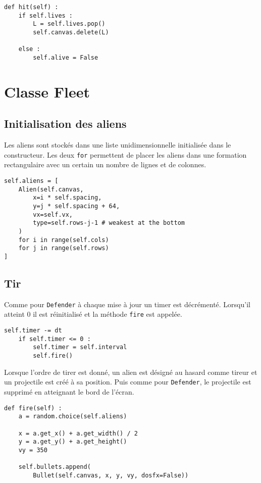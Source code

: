 \documentclass[12pt]{article}
\begin{document}
\begin{verbatim}
def hit(self) :
	if self.lives :
		L = self.lives.pop()
		self.canvas.delete(L)

	else :
		self.alive = False
\end{verbatim}
		





\vfill


\section{Classe Fleet}

	\subsection{Initialisation des aliens}

	Les aliens sont stockés dans une liste unidimensionnelle initialisée dans le constructeur. Les deux \texttt{for} permettent de placer les aliens dans une formation rectangulaire avec un certain un nombre de lignes et de colonnes.

\begin{verbatim}
self.aliens = [
	Alien(self.canvas, 
		x=i * self.spacing, 
		y=j * self.spacing + 64, 
		vx=self.vx, 
		type=self.rows-j-1 # weakest at the bottom
	)
	for i in range(self.cols)
	for j in range(self.rows)
]
\end{verbatim}



	\subsection{Tir}

	Comme pour \texttt{Defender} à chaque mise à jour un timer est décrémenté. Lorsqu'il atteint 0 il est 
	réinitialisé et la méthode \texttt{fire} est appelée.

\begin{verbatim}
self.timer -= dt
	if self.timer <= 0 :
		self.timer = self.interval
		self.fire()
\end{verbatim}

	Lorsque l'ordre de tirer est donné, un alien est désigné au hasard comme tireur et un projectile est créé à sa position. Puis comme pour \texttt{Defender}, le projectile est supprimé en atteignant le bord de l'écran.

\begin{verbatim}
def fire(self) :
	a = random.choice(self.aliens)

	x = a.get_x() + a.get_width() / 2
	y = a.get_y() + a.get_height()
	vy = 350
		
	self.bullets.append(
		Bullet(self.canvas, x, y, vy, dosfx=False))
\end{verbatim}
\end{document}
